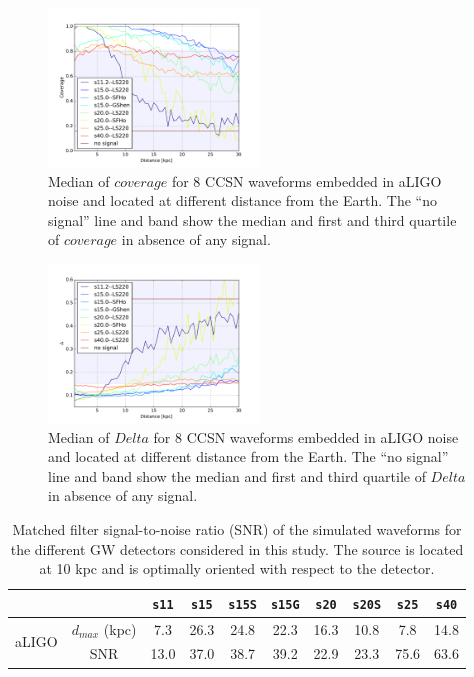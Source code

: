 \begin{figure}
  \centering
  \includegraphics[width=0.5\textwidth]{plots/aLIGO_coverage_allwvfs}
 \caption{Median of $coverage$ for 8 CCSN waveforms embedded in aLIGO noise and located at different distance from the Earth. The ``no signal'' line and band show the median and first and third quartile of $coverage$ in absence of any signal.} \label{fig:aLIGO_cov_allwvf}
\end{figure}

\begin{figure}
  \centering
  \includegraphics[width=0.5\textwidth]{plots/aLIGO_delta_allwvfs}
 \caption{Median of $Delta$ for 8 CCSN waveforms embedded in aLIGO noise and located at different distance from the Earth. The ``no signal'' line and band show the median and first and third quartile of $Delta$ in absence of any signal.} \label{fig:aLIGO_prec_allwvf}
\end{figure}


\begin{table}
  \centering
  \begin{tabular}{c|c|cccccccc}
    
    
\multicolumn{2}{c|}{}  & \texttt{s11} & \texttt{s15} & \texttt{s15S} & \texttt{s15G} & \texttt{s20} & \texttt{s20S} & \texttt{s25}  & \texttt{s40}\\   

\hline
\multirow{2}{*}{aLIGO} & $d_{max}$ (kpc) & 7.3  & 26.3 & 24.8 & 22.3 & 16.3 & 10.8 & 7.8  & 14.8\\
\cline{2-10}
                       & SNR            & 13.0 & 37.0 & 38.7 & 39.2 & 22.9 & 23.3 & 75.6 & 63.6\\
\hline
\hline

  \end{tabular}
  \caption{%
    Matched filter signal-to-noise ratio (SNR) of the simulated waveforms for
    the different GW detectors considered in this study. The source is located
    at 10 kpc and is optimally oriented with respect to the detector.
  }
  \label{tab:results}
\end{table}

